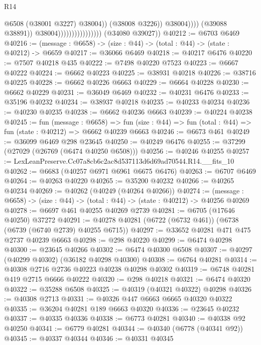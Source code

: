 \begin{lexlean}{R14}
\begin{coremodule}
                                                      @6508
                                                      (@38001 @3227)
                                                      @38004))
                                                  (@38008 @3226))
                                                @38004))))
                                        (@39088 @38891))
                                      @38004))))))))))))))))
      (@34080 @39027))
@40212 := @6703 @6469
@40216 := (message : @6658) -> (size : @44) -> (total : @44) -> (state : @40212) -> @6659
@40217 := @36066 @6469
@40218 := @40217 @6476
@40220 := @7507 @40218 @435
@40222 := @7498 @40220 @7523
@40223 := @6667 @40222
@40224 := @6662 @40223
@40225 := @38931 @40218
@40226 := @38716 @40225
@40228 := @6662 @40226 @6663
@40229 := @6664 @40228
@40230 := @6662 @40229
@40231 := @36049 @6469
@40232 := @40231 @6476
@40233 := @35196 @40232
@40234 := @38937 @40218
@40235 := @40233 @40234
@40236 := @40230 @40235
@40238 := @6662 @40236 @6663
@40239 := @40224 @40238
@40245 := fun (message : @6658) =>
  fun (size : @44) => fun (total : @44) => fun (state : @40212) => @6662 @40239 @6663
@40246 := @6673 @461
@40249 := @36099 @6469 @298 @23645
@40250 := @40249 @6476
@40255 := @37299 (@27029 (@26769 (@6474 @40250 @6508)))
@40256 := @40246 @40255
@40257 := LexLeanPreserve.Cc07a8cb6c2ac8d537113d6d69ad70544.R14.__fits_10
@40262 := @6683 (@40257 @6971 @6961 @6675 @6476)
@40263 := @6707 @6469
@40264 := @40263 @40220
@40265 := @35200 @40232
@40266 := @40265 @40234
@40269 := @40262 (@40249 (@40264 @40266))
@40274 := (message : @6658) -> (size : @44) -> (total : @44) -> (state : @40212) -> @40256 @40269
@40278 := @6697 @461 @40255 @40269 @2739
@40281 := @6705 (@17646 @40250) @37272
@40291 := @40278 @40281 (@6722 (@6732 @461)) (@6738 (@6739 (@6740 @2739) @40255 @6715))
@40297 := @33652 @40281 @471 @475 @2737 @40239 @6663
@40298 := @298 @40220
@40299 := @6474 @40298
@40300 := @23645 @40266
@40302 := @6474 @40300 @6508
@40307 := @40297 (@40299 @40302) (@36182 @40298 @40300)
@40308 := @6764 @40281
@40314 := @40308 @2716 @2736 @40223 @40238 @40298 @40302
@40319 := @6748 @40281 @419 @2715 @6666 @40222
@40320 := @298 @40218
@40321 := @6474 @40320
@40322 := @35288 @6508
@40325 := @40319 (@40321 @40322) @40298
@40326 := @40308 @2713
@40331 := @40326 @447 @6663 @6665 @40320 @40322
@40335 := @36204 @40281 @189 @6663 @40320
@40336 := @23645 @40232
@40337 := @40335 @40336
@40338 := @6773 @40281
@40340 := @40338 @92 @40250
@40341 := @6779 @40281
@40344 := @40340 (@6778 (@40341 @92))
@40345 := @40337 @40344
@40346 := @40331 @40345

\end{coremodule}
\end{lexlean}
